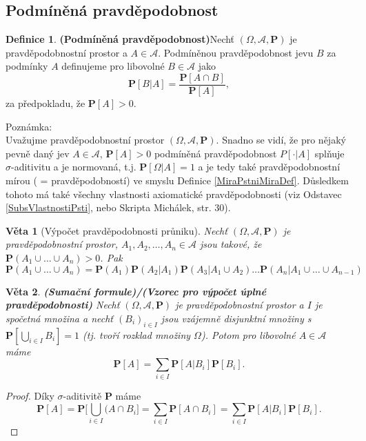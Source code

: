 \documentclass[a4]{report}
\newtheorem{theorem}{Věta}
\theoremstyle{definition}
\newtheorem{definition}{Definice}[section]
\begin{document}
{\subsection{Podmíněná pravděpodobnost}
\begin{definition}\textbf{(Podmíněná pravděpodobnost)}\label{podm_pst}
Nechť $( \Omega, \mathcal{A}, \textbf{P})$ je pravděpodobnostní prostor a $A \in \mathcal{A}$. Podmíněnou pravděpodobnost  jevu $B$ za podmínky $A$ definujeme pro libovolné $B \in \mathcal{A}$ jako
\begin{equation}
\textbf{P}[B|A] = \frac{\textbf{P}[A \cap B]}{\textbf{P}[A]},
\end{equation}
za předpokladu, že $ \textbf{P}[A] > 0 $.
\end{definition}

Poznámka: \\
Uvažujme pravděpodobnostní prostor $( \Omega, \mathcal{A}, \textbf{P})$. Snadno se vidí, že pro nějaký pevně daný jev $A \in \mathcal{A}$, $\textbf{P}[A] > 0$ podmíněná pravděpodobnost $P[\cdot | A] $ splňuje $\sigma$-aditivitu a je normovaná, t.j. $\textbf{P}[\Omega | A] = 1$ a je tedy také pravděpodobnostní mírou ( = pravděpodobností) ve smyslu Definice \ref{MiraPstniMiraDef}. Důsledkem tohoto má také všechny vlastnosti axiomatické pravděpodobnosti (viz Odstavec \ref{SubsVlastnostiPsti}, nebo Skripta Michálek, str. 30).
\begin{theorem}[Výpočet pravděpodobnosti průniku]
Nechť $(\Omega,\mathcal{A},\textbf{P})$ je pravděpodobnostní prostor, $A_1,A_2,\ldots,A_n \in \mathcal{A}$ jsou takové, že $\textbf{P}(A_1\cup \ldots \cup A_n) > 0$. Pak
\begin{equation*}
\textbf{P}(A_1\cup \ldots \cup A_n) =\textbf{P}(A_1)\textbf{P}(A_2|A_1)\textbf{P}(A_3|A_1\cup A_2)\ldots \textbf{P}(A_n|A_1\cup \ldots \cup A_{n-1})
\end{equation*}
\end{theorem}

\begin{theorem}\label{PodmPSumForm}\textbf{(Sumační formule)/(Vzorec pro výpočet úplné pravděpodobnosti)} Nechť $( \Omega, \mathcal{A}, \textbf{P})$ je pravděpodobnostní prostor a $I$ je spočetná množina a nechť $(B_{i})_{i \in I}$ jsou vzájemně disjunktní množiny s $\textbf{P}[\bigcup_{i \in I}B_{i}] = 1$ (tj. tvoří rozklad množiny $\Omega$). Potom pro libovolné $A \in \mathcal{A}$ máme
\begin{equation}
\textbf{P}[A] = \sum_{i \in I}\textbf{P}[A | B_{i}]\textbf{P}[B_{i}].
\end{equation}
\end{theorem}
\begin{proof}
Díky $\sigma$-aditivitě $\textbf{P}$ máme
\begin{equation}
\textbf{P}[A] = \textbf{P}\bigg[ \bigcup_{i \in I}(A \cap B_{i} \bigg] = \sum_{i\in I} \textbf{P}[A \cap B_{i}] = \sum_{i \in I}\textbf{P}[A|B_{i}]\textbf{P}[B_{i}].
\end{equation}
\end{proof}

}
\end{document}
